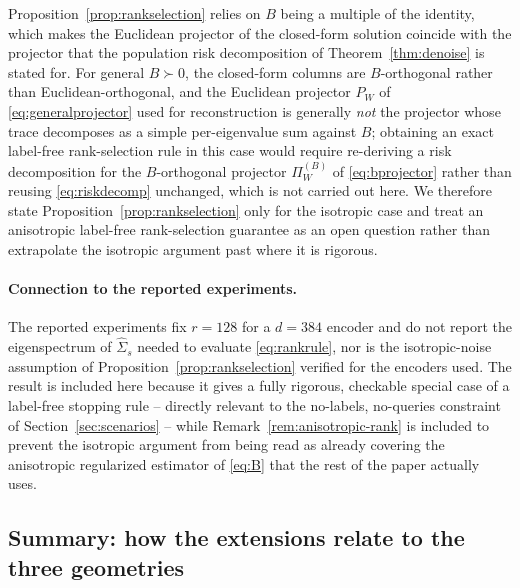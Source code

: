 \begin{remark}
\label{rem:anisotropic-rank}
Proposition~\ref{prop:rankselection} relies on $B$ being a multiple of the
identity, which makes the Euclidean projector of the closed-form solution
coincide with the projector that the population risk decomposition of
Theorem~\ref{thm:denoise} is stated for. For general $B\succ0$, the
closed-form columns are $B$-orthogonal rather than Euclidean-orthogonal,
and the Euclidean projector $P_W$ of \cref{eq:generalprojector} used for
reconstruction is generally \emph{not} the projector whose trace
decomposes as a simple per-eigenvalue sum against $B$; obtaining an exact
label-free rank-selection rule in this case would require re-deriving a
risk decomposition for the $B$-orthogonal projector $\Pi_W^{(B)}$ of
\cref{eq:bprojector} rather than reusing \cref{eq:riskdecomp} unchanged,
which is not carried out here. We therefore state
Proposition~\ref{prop:rankselection} only for the isotropic case and treat
an anisotropic label-free rank-selection guarantee as an open question
rather than extrapolate the isotropic argument past where it is rigorous.
\end{remark}

\paragraph{Connection to the reported experiments.}
The reported experiments fix $r=128$ for a $d=384$ encoder and do not
report the eigenspectrum of $\widehat\Sigma_s$ needed to evaluate
\cref{eq:rankrule}, nor is the isotropic-noise assumption of
Proposition~\ref{prop:rankselection} verified for the encoders used. The
result is included here because it gives a fully rigorous, checkable
special case of a label-free stopping rule -- directly relevant to the
no-labels, no-queries constraint of Section~\ref{sec:scenarios} -- while
Remark~\ref{rem:anisotropic-rank} is included to prevent the isotropic
argument from being read as already covering the anisotropic regularized
estimator of \cref{eq:B} that the rest of the paper actually uses.

\subsection{Summary: how the extensions relate to the three geometries}


